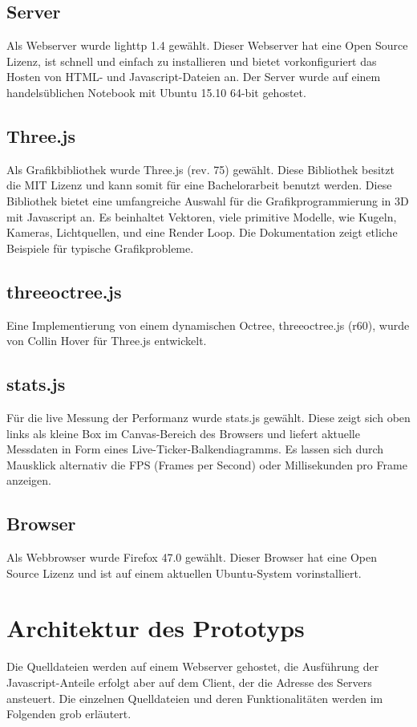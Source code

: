 \documentclass[draft=false
              ,paper=a4
              ,twoside=false
              ,fontsize=11pt
              ,headsepline
              ,BCOR10mm
              ,DIV11
              ,bibtotoc
              ,liststotoc
              ]{scrbook}
\begin{document}
\subsection{Server}
Als Webserver wurde lighttp 1.4 gewählt. Dieser Webserver hat eine Open Source Lizenz, ist schnell und einfach zu installieren und bietet vorkonfiguriert das Hosten von HTML- und Javascript-Dateien an. Der Server wurde auf einem handelsüblichen Notebook mit Ubuntu 15.10 64-bit gehostet.
\subsection{Three.js}
Als Grafikbibliothek wurde Three.js (rev. 75) gewählt. Diese Bibliothek besitzt die MIT Lizenz und kann somit für eine Bachelorarbeit benutzt werden. Diese Bibliothek bietet eine umfangreiche Auswahl für die Grafikprogrammierung in 3D mit Javascript an. Es beinhaltet Vektoren, viele primitive Modelle, wie Kugeln, Kameras, Lichtquellen, und eine Render Loop. Die Dokumentation zeigt etliche Beispiele für typische Grafikprobleme.
\subsection{threeoctree.js}
Eine Implementierung von einem dynamischen Octree, threeoctree.js (r60), wurde von Collin Hover für Three.js entwickelt.
\subsection{stats.js}
Für die live Messung der Performanz wurde stats.js gewählt. Diese zeigt sich oben links als kleine Box im Canvas-Bereich des Browsers und liefert aktuelle Messdaten in Form eines Live-Ticker-Balkendiagramms. Es lassen sich durch Mausklick alternativ die FPS (Frames per Second) oder Millisekunden pro Frame anzeigen.
\subsection{Browser}
Als Webbrowser wurde Firefox 47.0 gewählt. Dieser Browser hat eine Open Source Lizenz und ist auf einem aktuellen Ubuntu-System vorinstalliert.
\section{Architektur des Prototyps}
Die Quelldateien werden auf einem Webserver gehostet, die Ausführung der Javascript-Anteile erfolgt aber auf dem Client, der die Adresse des Servers ansteuert.
Die einzelnen Quelldateien und deren Funktionalitäten werden im Folgenden grob erläutert.
\end{document}
